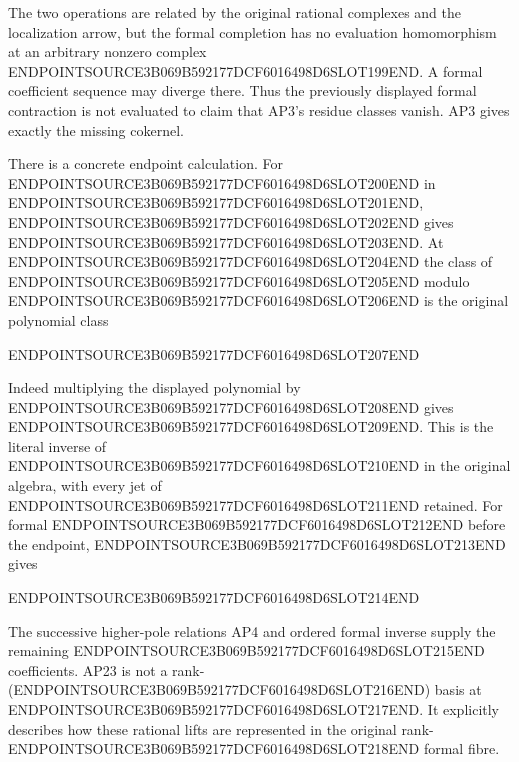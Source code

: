 The two operations are related by the original rational complexes and the localization arrow, but the formal completion has no evaluation homomorphism at an arbitrary nonzero complex ENDPOINTSOURCE3B069B592177DCF6016498D6SLOT199END. A formal coefficient sequence may diverge there. Thus the previously displayed formal contraction is not evaluated to claim that AP3's residue classes vanish. AP3 gives exactly the missing cokernel.

There is a concrete endpoint calculation. For ENDPOINTSOURCE3B069B592177DCF6016498D6SLOT200END in ENDPOINTSOURCE3B069B592177DCF6016498D6SLOT201END, ENDPOINTSOURCE3B069B592177DCF6016498D6SLOT202END gives ENDPOINTSOURCE3B069B592177DCF6016498D6SLOT203END. At ENDPOINTSOURCE3B069B592177DCF6016498D6SLOT204END the class of ENDPOINTSOURCE3B069B592177DCF6016498D6SLOT205END modulo ENDPOINTSOURCE3B069B592177DCF6016498D6SLOT206END is the original polynomial class

ENDPOINTSOURCE3B069B592177DCF6016498D6SLOT207END

Indeed multiplying the displayed polynomial by ENDPOINTSOURCE3B069B592177DCF6016498D6SLOT208END gives ENDPOINTSOURCE3B069B592177DCF6016498D6SLOT209END. This is the literal inverse of ENDPOINTSOURCE3B069B592177DCF6016498D6SLOT210END in the original algebra, with every jet of ENDPOINTSOURCE3B069B592177DCF6016498D6SLOT211END retained. For formal ENDPOINTSOURCE3B069B592177DCF6016498D6SLOT212END before the endpoint, ENDPOINTSOURCE3B069B592177DCF6016498D6SLOT213END gives

ENDPOINTSOURCE3B069B592177DCF6016498D6SLOT214END

The successive higher-pole relations AP4 and ordered formal inverse supply the remaining ENDPOINTSOURCE3B069B592177DCF6016498D6SLOT215END coefficients. AP23 is not a rank-(ENDPOINTSOURCE3B069B592177DCF6016498D6SLOT216END) basis at ENDPOINTSOURCE3B069B592177DCF6016498D6SLOT217END. It explicitly describes how these rational lifts are represented in the original rank-ENDPOINTSOURCE3B069B592177DCF6016498D6SLOT218END formal fibre.

